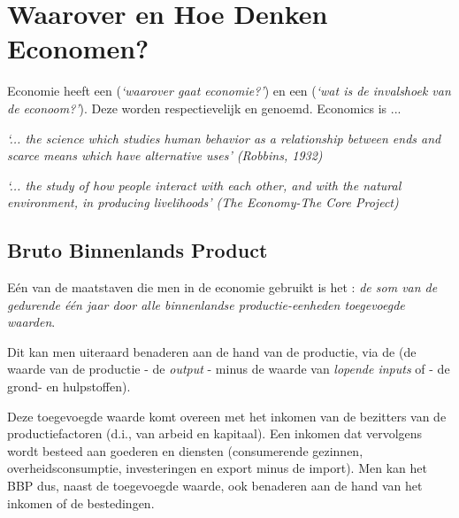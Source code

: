 \section{Waarover en Hoe Denken Economen?}

Economie heeft een  (\textit{`waarover gaat economie?'}) en een  (\textit{`wat is de invalshoek van de econoom?'}). Deze worden respectievelijk  en  genoemd. Economics is ...
\begin{leftbar}
\textit{`... the science which studies human behavior as a relationship between ends and scarce means which have alternative uses' (Robbins, 1932)}\\
\par\textit{`... the study of how people interact with each other, and with the natural environment, in producing livelihoods' (The Economy-The Core Project)}
\end{leftbar}

\subsection{Bruto Binnenlands Product}\label{sec:h1bbp}

E\'en van de maatstaven die men in de economie gebruikt is het  : \textit{de som van de gedurende \'e\'en jaar door alle binnenlandse productie-eenheden toegevoegde waarden}.
\par Dit kan men uiteraard benaderen aan de hand van de productie, via de  (de waarde van de productie - de \textit{output} - minus de waarde van \textit{lopende inputs} of  - de grond- en hulpstoffen).
\par Deze toegevoegde waarde komt overeen met het inkomen van de bezitters van de productiefactoren (d.i., van arbeid en kapitaal). Een inkomen dat vervolgens wordt besteed aan goederen en diensten (consumerende gezinnen, overheidsconsumptie, investeringen en export minus de import). Men kan het BBP dus, naast de toegevoegde waarde, ook benaderen aan de hand van het inkomen of de bestedingen.\\


